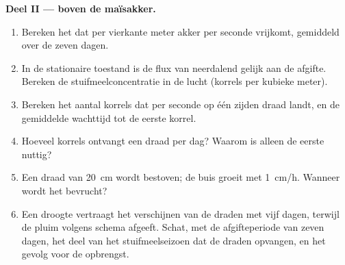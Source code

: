 \begin{problem}
\medskip
\noindent\textbf{Deel II ---  boven de maïsakker.}
\begin{enumerate}[resume]
  \item Bereken het  dat per vierkante meter akker per seconde
        vrijkomt, gemiddeld over de zeven dagen.
  \item In de stationaire toestand is de flux van neerdalend 
        gelijk aan de afgifte. Bereken de stuifmeelconcentratie in de lucht
        (korrels per kubieke meter).
  \item Bereken het aantal korrels dat per seconde op één zijden draad
        landt, en de gemiddelde wachttijd tot de eerste korrel.
  \item Hoeveel korrels ontvangt een draad per dag? Waarom is alleen de
        eerste nuttig?
  \item Een draad van \qty{20}{cm} wordt bestoven; de buis groeit met
        \qty{1}{cm/h}. Wanneer wordt het  bevrucht?
  \item Een droogte vertraagt het verschijnen van de draden met vijf dagen,
        terwijl de pluim volgens schema  afgeeft. Schat, met de
        afgifteperiode van zeven dagen, het deel van het stuifmeelseizoen
        dat de draden opvangen, en het gevolg voor de opbrengst.
\end{enumerate}


\end{problem}
